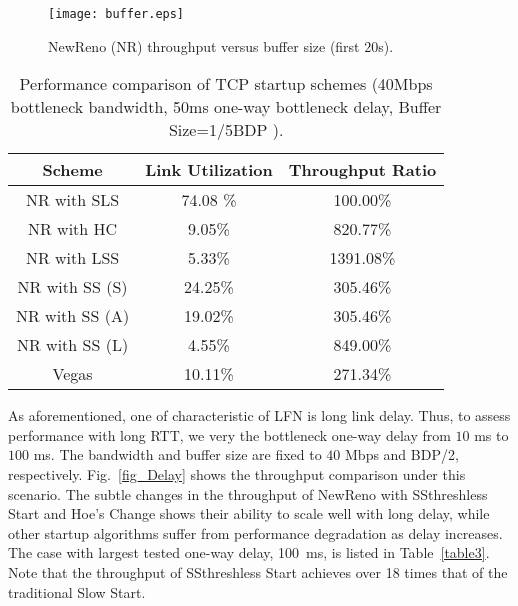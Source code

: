 \documentclass[12pt,onecolumn]{IEEEtran}
\begin{document}
\begin{figure}
\centering
\texttt{[image: buffer.eps]}
\caption{NewReno (NR) throughput versus buffer size (first $20$s).} \label{fig_Buffer}
\end{figure}
\begin{table}[h]
\centering
\caption{\footnotesize  Performance comparison of TCP startup schemes (40Mbps bottleneck bandwidth, 50ms one-way bottleneck delay, Buffer Size=1/5BDP ).}
\begin{tabular}{|c|c|c|} \hline
Scheme & Link Utilization & Throughput Ratio\\ \hline \hline
NR with SLS & 74.08 \%  &   100.00\% \\ \hline NR with HC & 9.05\%  &   820.77\%  \\ \hline
NR with LSS & 5.33\%  &   1391.08\% \\ \hline
NR with SS (S) &   24.25\% & 305.46\% \\ \hline
NR with SS (A) &   19.02\% & 305.46\% \\ \hline
NR with SS (L) & 4.55\%  &   849.00\% \\ \hline
Vegas & 10.11\%  &   271.34\% \\ \hline
\end{tabular}
\label{table4}
\end{table}


As aforementioned, one of characteristic of LFN is long link delay. Thus, to
assess performance with long RTT, we very the bottleneck one-way delay from
$10$ ms to $100$ ms. The bandwidth and buffer size are fixed to $40$ Mbps and
BDP/2, respectively. Fig.~\ref{fig_Delay} shows the throughput comparison under
this scenario. The subtle changes in the throughput of NewReno with
SSthreshless Start and Hoe's Change shows their ability to scale well with long
delay, while other startup algorithms suffer from performance degradation as
delay increases. The case with largest tested one-way delay, 100~ms, is listed
in Table~\ref{table3}. Note that the throughput of SSthreshless Start achieves
over 18 times that of the traditional Slow Start.
\end{document}
